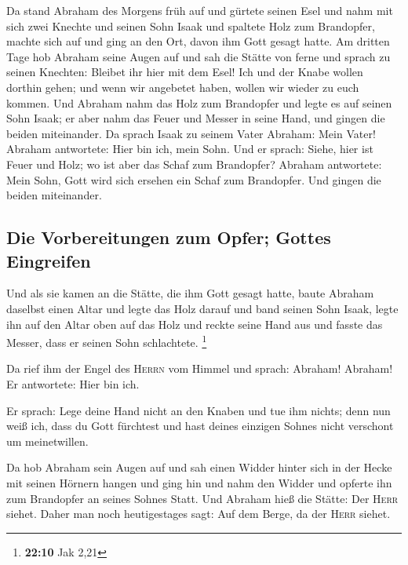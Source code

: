  Da stand Abraham des Morgens früh auf und gürtete seinen
Esel und nahm mit sich zwei Knechte und seinen Sohn Isaak und spaltete
Holz zum Brandopfer, machte sich auf und ging an den Ort, davon ihm Gott
gesagt hatte.  Am dritten Tage hob Abraham seine Augen auf
und sah die Stätte von ferne  und sprach zu seinen
Knechten: Bleibet ihr hier mit dem Esel! Ich und der Knabe wollen
dorthin gehen; und wenn wir angebetet haben, wollen wir wieder zu euch
kommen.  Und Abraham nahm das Holz zum Brandopfer und
legte es auf seinen Sohn Isaak; er aber nahm das Feuer und Messer in
seine Hand, und gingen die beiden miteinander.  Da sprach
Isaak zu seinem Vater Abraham: Mein Vater! Abraham antwortete: Hier bin
ich, mein Sohn. Und er sprach: Siehe, hier ist Feuer und Holz; wo ist
aber das Schaf zum Brandopfer?  Abraham antwortete: Mein
Sohn, Gott wird sich ersehen ein Schaf zum Brandopfer. Und gingen die
beiden miteinander.

\hypertarget{die-vorbereitungen-zum-opfer-gottes-eingreifen}{%
\subsection{Die Vorbereitungen zum Opfer; Gottes
Eingreifen}\label{die-vorbereitungen-zum-opfer-gottes-eingreifen}}

 Und als sie kamen an die Stätte, die ihm Gott gesagt
hatte, baute Abraham daselbst einen Altar und legte das Holz darauf und
band seinen Sohn Isaak, legte ihn auf den Altar oben auf das Holz
 und reckte seine Hand aus und fasste das Messer, dass er
seinen Sohn schlachtete. \footnote{\textbf{22:10} Jak 2,21}

 Da rief ihm der Engel des \textsc{Herrn} vom Himmel und
sprach: Abraham! Abraham! Er antwortete: Hier bin ich.

 Er sprach: Lege deine Hand nicht an den Knaben und tue
ihm nichts; denn nun weiß ich, dass du Gott fürchtest und hast deines
einzigen Sohnes nicht verschont um meinetwillen.

 Da hob Abraham sein Augen auf und sah einen Widder
hinter sich in der Hecke mit seinen Hörnern hangen und ging hin und nahm
den Widder und opferte ihn zum Brandopfer an seines Sohnes Statt.
 Und Abraham hieß die Stätte: Der \textsc{Herr} siehet.
Daher man noch heutigestages sagt: Auf dem Berge, da der \textsc{Herr}
siehet.

